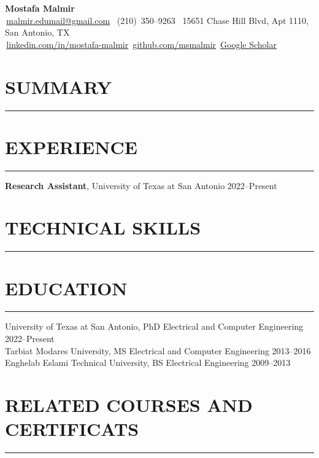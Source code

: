 \documentclass[9pt,letterpaper]{extarticle}
\newcommand{\sectionsep}{%
  \par
  \vspace{-2ex}%
  \noindent\rule{\textwidth}{1pt}%
  \vspace{-0.5ex}%
  \par
}
\begin{document}
\begin{center}
  {\LARGE\bfseries Mostafa Malmir}\\[0.5ex]
  {\small
    \faEnvelope\,\href{mailto:malmir.edumail@gmail.com}{malmir.edumail@gmail.com} \quad
    \faPhone\, (210)~350--9263 \quad
    \faMapMarker\, 15651 Chase Hill Blvd, Apt 1110, San Antonio, TX\\
    \faLinkedin\,\href{https://www.linkedin.com/in/mostafa-malmir/}{linkedin.com/in/mostafa-malmir} \quad
    \faGithub\,\href{https://github.com/msmalmir}{github.com/msmalmir} \quad
    \faGraduationCap\,\href{https://scholar.google.com/citations?user=GZ4wP8YAAAAJ&hl=en}{Google Scholar}
  }
\end{center}

\section*{SUMMARY}\sectionsep


\section*{EXPERIENCE}\sectionsep
\textbf{Research Assistant}, University of Texas at San Antonio \hfill 2022--Present
\begin{itemize}


\end{itemize}


\section*{TECHNICAL SKILLS}\sectionsep

 

\section*{EDUCATION}\sectionsep
University of Texas at San Antonio, PhD Electrical and Computer Engineering \hfill 2022--Present\\
Tarbiat Modares University, MS Electrical and Computer Engineering \hfill 2013--2016\\
Enghelab Eslami Technical University, BS Electrical Engineering \hfill 2009--2013

\section*{RELATED COURSES AND CERTIFICATS}\sectionsep
\end{document}
